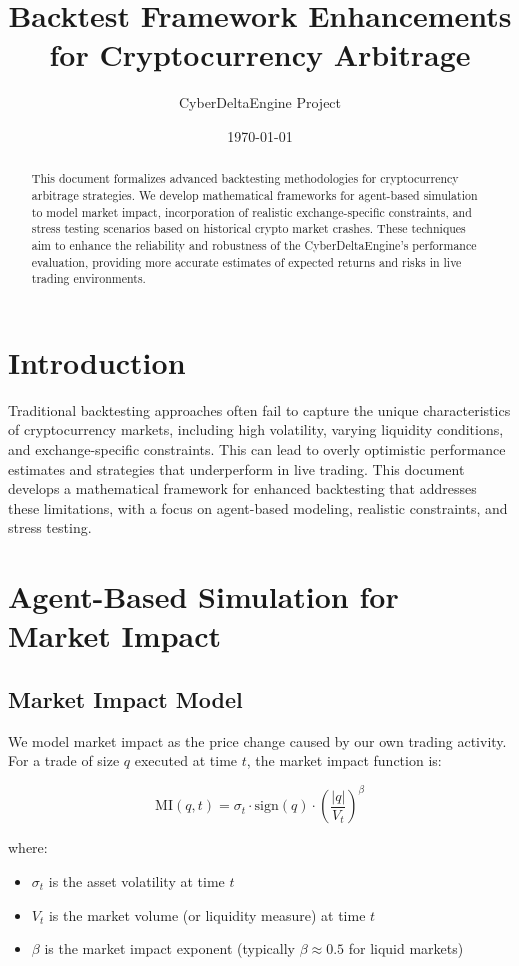 \documentclass{article}
\title{Backtest Framework Enhancements for Cryptocurrency Arbitrage}
\author{CyberDeltaEngine Project}
\date{\today}
\begin{document}
\maketitle

\begin{abstract}
This document formalizes advanced backtesting methodologies for cryptocurrency arbitrage strategies. We develop mathematical frameworks for agent-based simulation to model market impact, incorporation of realistic exchange-specific constraints, and stress testing scenarios based on historical crypto market crashes. These techniques aim to enhance the reliability and robustness of the CyberDeltaEngine's performance evaluation, providing more accurate estimates of expected returns and risks in live trading environments.
\end{abstract}

\section{Introduction}

Traditional backtesting approaches often fail to capture the unique characteristics of cryptocurrency markets, including high volatility, varying liquidity conditions, and exchange-specific constraints. This can lead to overly optimistic performance estimates and strategies that underperform in live trading. This document develops a mathematical framework for enhanced backtesting that addresses these limitations, with a focus on agent-based modeling, realistic constraints, and stress testing.

\section{Agent-Based Simulation for Market Impact}

\subsection{Market Impact Model}

We model market impact as the price change caused by our own trading activity. For a trade of size $q$ executed at time $t$, the market impact function is:

\begin{equation}
\text{MI}(q, t) = \sigma_t \cdot \text{sign}(q) \cdot \left( \frac{|q|}{V_t} \right)^{\beta}
\end{equation}

where:
\begin{itemize}
    \item $\sigma_t$ is the asset volatility at time $t$
    \item $V_t$ is the market volume (or liquidity measure) at time $t$
    \item $\beta$ is the market impact exponent (typically $\beta \approx 0.5$ for liquid markets)
\end{itemize}
\end{document}
